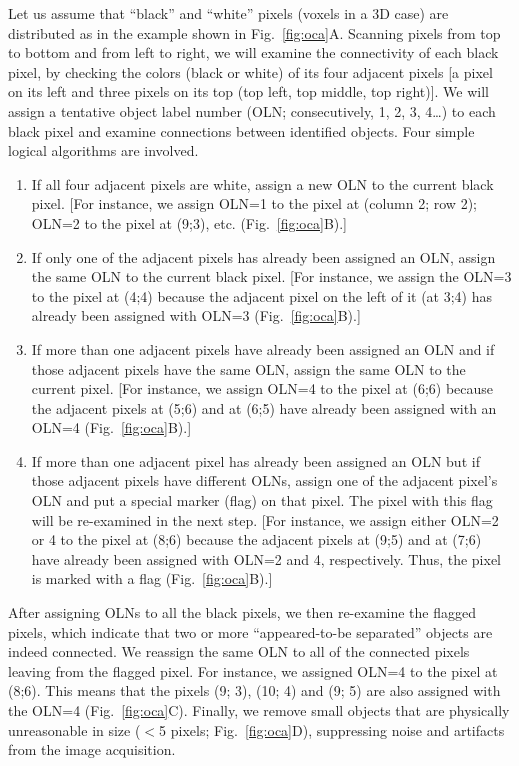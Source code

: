 Let us assume that ``black'' and ``white'' pixels (voxels in a 3D case) are distributed as in the example shown in Fig.~\ref{fig:oca}A. Scanning pixels from top to bottom and from left to right, we will examine the connectivity of each black pixel, by checking the colors (black or white) of its four adjacent pixels [a pixel on its left and three pixels on its top (top left, top middle, top right)]. We will assign a tentative object label number (OLN; consecutively, 1, 2, 3, 4\ldots) to each black pixel and examine connections between identified objects. Four simple logical algorithms are involved.
\begin{enumerate}
	\item If all four adjacent pixels are white, assign a new OLN to the current black pixel. [For instance, we assign OLN=1 to the pixel at (column 2; row 2); OLN=2 to the pixel at (9;3), etc. (Fig.~\ref{fig:oca}B).]
	\item If only one of the adjacent pixels has already been assigned an OLN, assign the same OLN to the current black pixel. [For instance, we assign the OLN=3 to the pixel at (4;4) because the adjacent pixel on the left of it (at 3;4) has already been assigned with OLN=3 (Fig.~\ref{fig:oca}B).]
	\item If more than one adjacent pixels have already been assigned an OLN and if those adjacent pixels have the same OLN, assign the same OLN to the current pixel. [For instance, we assign OLN=4 to the pixel at (6;6) because the adjacent pixels at (5;6) and at (6;5) have already been assigned with an OLN=4 (Fig.~\ref{fig:oca}B).]
	\item If more than one adjacent pixel has already been assigned an OLN but if those adjacent pixels have different OLNs, assign one of the adjacent pixel's OLN and put a special marker (flag) on that pixel. The pixel with this flag will be re-examined in the next step. [For instance, we assign either OLN=2 or 4 to the pixel at (8;6) because the adjacent pixels at (9;5) and at (7;6) have already been assigned with OLN=2 and 4, respectively. Thus, the pixel is marked with a flag (Fig.~\ref{fig:oca}B).]
\end{enumerate}
After assigning OLNs to all the black pixels, we then re-examine the flagged pixels, which indicate that two or more ``appeared-to-be separated'' objects are indeed connected. We reassign the same OLN to all of the connected pixels leaving from the flagged pixel. For instance, we assigned OLN=4 to the pixel at (8;6). This means that the pixels (9; 3), (10; 4) and (9; 5) are also assigned with the OLN=4 (Fig.~\ref{fig:oca}C). Finally, we remove small objects that are physically unreasonable in size ($<$5 pixels; Fig.~\ref{fig:oca}D), suppressing noise and artifacts from the image acquisition.

